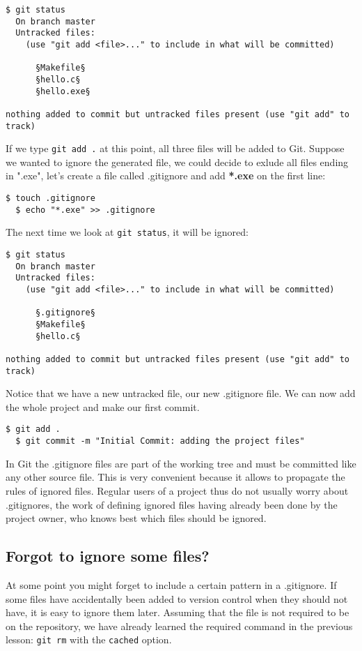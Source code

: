 \documentclass{../common/tufte-latex/tufte-handout}
\begin{document}
\begin{lstlisting}[style=BashInputStyle]
  $ git status
  On branch master
  Untracked files:
    (use "git add <file>..." to include in what will be committed)
  
      §Makefile§
      §hello.c§
      §hello.exe§

nothing added to commit but untracked files present (use "git add" to track)
\end{lstlisting}

If we type \texttt{git add .} at this point, all three files will be added to Git.
Suppose we wanted to ignore the generated file, we could decide to exlude all files ending in ".exe", let's create a file called .gitignore and add \textbf{*.exe} on the first line:
\begin{lstlisting}[style=BashInputStyle]
  $ touch .gitignore
  $ echo "*.exe" >> .gitignore
\end{lstlisting}

The next time we look at \texttt{git status}, it will be ignored:
\begin{lstlisting}[style=BashInputStyle]
  $ git status
  On branch master
  Untracked files:
    (use "git add <file>..." to include in what will be committed)
  
      §.gitignore§
      §Makefile§
      §hello.c§

nothing added to commit but untracked files present (use "git add" to track)
\end{lstlisting}

Notice that we have a new untracked file, our new .gitignore file.
We can now add the whole project and make our first commit.

\begin{lstlisting}[style=BashInputStyle]
  $ git add .
  $ git commit -m "Initial Commit: adding the project files"
\end{lstlisting}

In Git the .gitignore files are part of the working tree and must be committed like any other source file.
This is very convenient because it allows to propagate the rules of ignored files.
Regular users of a project thus do not usually worry about .gitignores, the work of defining ignored files having already been done by the project owner, who knows best which files should be ignored.

\subsection{Forgot to ignore some files?}
At some point you might forget to include a certain pattern in a .gitignore.
If some files have accidentally been added to version control when they should not have, it is easy to ignore them later.
Assuming that the file is not required to be on the repository, we have already learned the required command in the previous lesson: \texttt{git rm} with the \texttt{cached} option.
\end{document}
